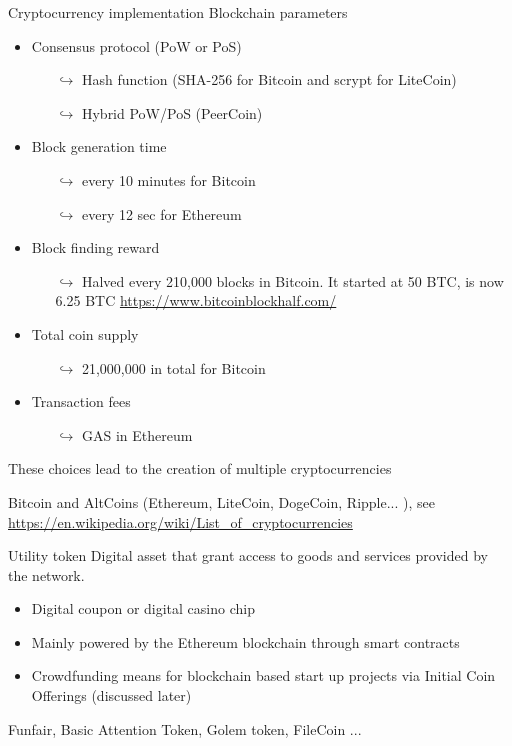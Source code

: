 \documentclass{beamer}
\begin{document}
\begin{frame}{Cryptocurrency implementation}
\scriptsize
Blockchain parameters
\begin{itemize}
  \item Consensus protocol (PoW or PoS) 
  \begin{itemize}
    \item[$\hookrightarrow$] \tiny Hash function (SHA-256 for Bitcoin and scrypt for LiteCoin) 
    \item[$\hookrightarrow$] \tiny Hybrid PoW/PoS (PeerCoin)
  \end{itemize}
  \item Block generation time \scriptsize
    \begin{itemize}
    \item[$\hookrightarrow$] \tiny every 10 minutes for Bitcoin 
    \item[$\hookrightarrow$] \tiny every 12 sec for Ethereum
  \end{itemize}
  \item Block finding reward\scriptsize
  \begin{itemize}
    \item[$\hookrightarrow$] \tiny Halved every 210,000 blocks in Bitcoin. It started at 50 BTC, is now 6.25 BTC \url{https://www.bitcoinblockhalf.com/}
  \end{itemize}
  \item Total coin supply\scriptsize
    \begin{itemize}
    \item[$\hookrightarrow$] \tiny 21,000,000 in total for Bitcoin
  \end{itemize}
  \item Transaction fees\scriptsize
      \begin{itemize}
    \item[$\hookrightarrow$] \tiny GAS in Ethereum
  \end{itemize}
\end{itemize}
These choices lead to the creation of multiple cryptocurrencies 
\begin{tcolorbox}[enhanced,drop shadow, title=Examples]
     Bitcoin and AltCoins (Ethereum, LiteCoin, DogeCoin, Ripple... ), see \url{https://en.wikipedia.org/wiki/List_of_cryptocurrencies}
\end{tcolorbox}

\end{frame}
\begin{frame}{Utility token}
Digital asset that grant access to goods and services provided by the network.  
\begin{itemize}
  \item Digital coupon or digital casino chip
  \item Mainly powered by the Ethereum blockchain through smart contracts
  \item Crowdfunding means for blockchain based start up projects via Initial Coin Offerings (discussed later)
\end{itemize}
\begin{tcolorbox}[enhanced,drop shadow, title=Examples]
    Funfair, Basic Attention Token, Golem token, FileCoin ...
\end{tcolorbox}
\end{frame}
\end{document}
